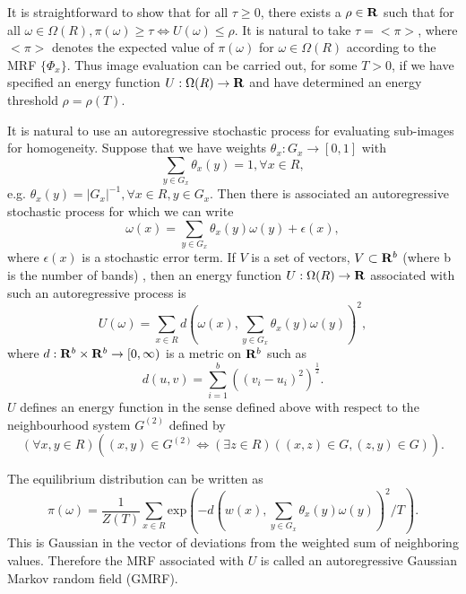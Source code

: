 \documentclass[12pt,twoside]{article}
\begin{document}
It is straightforward to show that for all $\tau\geq 0$, there exists a $\rho \in {\bf R}$ such that for all $\omega\in\Omega(R),
\pi(\omega) \geq\tau\Leftrightarrow U(\omega) \leq\rho$. It is natural to take $\tau = < \pi >$, where $< \pi >$ denotes the expected value of
$\pi(\omega)$ for $\omega\in\Omega(R)$ according to the MRF $\{\Phi_x\}$. Thus image evaluation can be carried out, for
some $T > 0$, if we have specified an energy function $U : \Omega(R) \rightarrow {\bf R}$ and have determined an energy
threshold $\rho = \rho(T)$.

It is natural to use an autoregressive stochastic process for evaluating sub-images for homogeneity.
Suppose that we have weights $\theta_x : G_x \rightarrow [0,1]$ with
\begin{equation}
\sum_{y\in G_x}\theta_x(y)=1, \forall x\in R,
\end{equation}
e.g. $\theta_x(y) = |G_x|^{-1}, \forall x \in R, y \in G_x$.
Then there is associated an autoregressive stochastic process for which we can write
\begin{equation}
\omega(x) = \sum_{y\in G_x}\theta_x(y)\omega(y) + \epsilon(x),
\end{equation}
where $\epsilon(x)$ is a stochastic error term. If $V$ is a set of vectors, $V \subset {\bf R}^b$ (where b is the number of
bands) , then an energy function $U : \Omega(R) \rightarrow {\bf R}$ associated with such an autoregressive process is
\begin{equation}
U(\omega) = \sum_{x\in R}d(\omega(x), \sum_{y\in G_x}\theta_x(y)\omega(y))^2,
\end{equation}
where $d : {\bf R}^b \times {\bf R}^b \rightarrow [0,\infty)$ is a metric on ${\bf R}^b$ such as
\begin{equation}
d(u,v) = \sum_{i=1}^b((v_i - u_i)^2)^{\frac{1}{2}}.
\end{equation}
$U$ defines an energy function in the sense defined above with respect to the neighbourhood
system $G^{(2)}$ defined by
\begin{equation}
(\forall x, y \in R) ((x,y) \in G^{(2)} \Leftrightarrow (\exists z \in R) ((x, z) \in G, (z, y) \in G)).
\end{equation}

The equilibrium distribution can be written as
\begin{equation}
\pi(\omega) = \frac{1}{Z(T)}\sum_{x\in R}\mbox{exp}(- d(w(x),\sum_{y\in G_x}\theta_x(y)\omega(y))^2/T).
\end{equation}
This is Gaussian in the vector of deviations from the weighted sum of neighboring values.
Therefore the MRF associated with $U$ is called an autoregressive Gaussian Markov random
field (GMRF).
\end{document}
